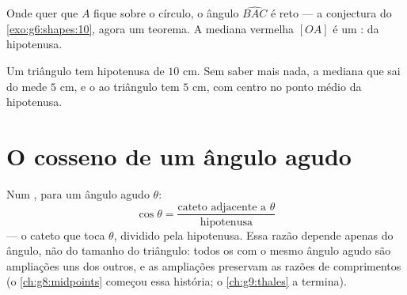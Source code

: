 \begin{omfigure}

{\small Onde quer que $A$ fique sobre o círculo, o ângulo
$\widehat{BAC}$ é reto --- a conjectura do \cref{exo:g6:shapes:10},
agora um teorema. A mediana vermelha $[OA]$ é um :  da
hipotenusa.}
\end{omfigure}

\begin{example}\label{ex:g8:cosine:circle}
Um triângulo tem hipotenusa de $10$ cm. Sem saber mais nada, a mediana
que sai do  mede $5$ cm, e o  ao
triângulo tem  $5$ cm, com centro no ponto médio da hipotenusa.
\end{example}

\section{O cosseno de um ângulo agudo}

\begin{definition}[Cosseno]\label{def:g8:cosine:def}
Num , para um ângulo agudo $\theta$:
\[
\cos\theta
= \frac{\text{cateto adjacente a } \theta}{\text{hipotenusa}}
\]
--- o cateto que toca $\theta$, dividido pela hipotenusa. Essa razão
depende apenas do ângulo, não do tamanho do triângulo: todos os
 com o mesmo ângulo agudo são ampliações uns dos
outros, e as ampliações preservam as razões de comprimentos (o
\cref{ch:g8:midpoints} começou essa história; o \cref{ch:g9:thales} a
termina).
\end{definition}

